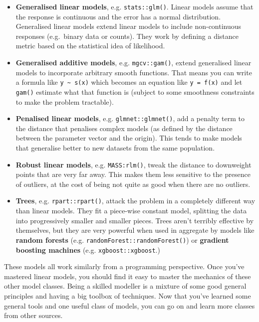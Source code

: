 \documentclass[]{book}
\begin{document}
\begin{itemize}
\item
  \textbf{Generalised linear models}, e.g. \texttt{stats::glm()}. Linear
  models assume that the response is continuous and the error has a
  normal distribution. Generalised linear models extend linear models to
  include non-continuous responses (e.g.~binary data or counts). They
  work by defining a distance metric based on the statistical idea of
  likelihood.
\item
  \textbf{Generalised additive models}, e.g. \texttt{mgcv::gam()},
  extend generalised linear models to incorporate arbitrary smooth
  functions. That means you can write a formula like
  \texttt{y\ \textasciitilde{}\ s(x)} which becomes an equation like
  \texttt{y\ =\ f(x)} and let \texttt{gam()} estimate what that function
  is (subject to some smoothness constraints to make the problem
  tractable).
\item
  \textbf{Penalised linear models}, e.g. \texttt{glmnet::glmnet()}, add
  a penalty term to the distance that penalises complex models (as
  defined by the distance between the parameter vector and the origin).
  This tends to make models that generalise better to new datasets from
  the same population.
\item
  \textbf{Robust linear models}, e.g. \texttt{MASS:rlm()}, tweak the
  distance to downweight points that are very far away. This makes them
  less sensitive to the presence of outliers, at the cost of being not
  quite as good when there are no outliers.
\item
  \textbf{Trees}, e.g. \texttt{rpart::rpart()}, attack the problem in a
  completely different way than linear models. They fit a piece-wise
  constant model, splitting the data into progressively smaller and
  smaller pieces. Trees aren't terribly effective by themselves, but
  they are very powerful when used in aggregate by models like
  \textbf{random forests} (e.g. \texttt{randomForest::randomForest()})
  or \textbf{gradient boosting machines} (e.g.
  \texttt{xgboost::xgboost}.)
\end{itemize}

These models all work similarly from a programming perspective. Once
you've mastered linear models, you should find it easy to master the
mechanics of these other model classes. Being a skilled modeller is a
mixture of some good general principles and having a big toolbox of
techniques. Now that you've learned some general tools and one useful
class of models, you can go on and learn more classes from other
sources.
\end{document}
